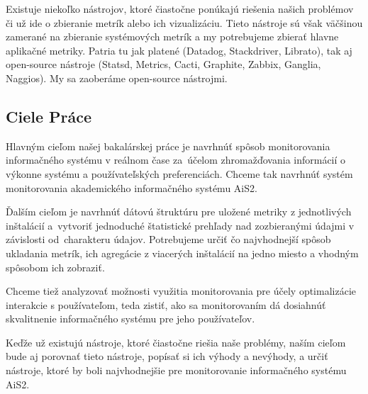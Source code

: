 \documentclass[a4paper, usesections, upjsfrontpage, thesismargins, thesislinespacing]{rnthesis}
\begin{document}
Existuje niekoľko nástrojov, ktoré čiastočne ponúkajú riešenia našich problémov či už ide o zbieranie metrík alebo ich vizualizáciu.
Tieto nástroje sú však väčšinou zamerané na zbieranie systémových metrík a my potrebujeme zbierať hlavne aplikačné metriky.
Patria tu jak platené (Datadog, Stackdriver, Librato), tak aj open-source nástroje (Statsd, Metrics, Cacti, Graphite, Zabbix, Ganglia, Naggios).
My sa zaoberáme open-source nástrojmi.


\subsection{Ciele Práce}


Hlavným cieľom našej bakalárskej práce je navrhnúť spôsob monitorovania informačného systému v reálnom čase za~úče\-lom zhromažďovania informácií o výkonne systému a používateľských pre\-ferenciách. 
Chceme tak navrhnúť systém monitorovania akademického informačného systému AiS2.

Ďalším cieľom je navrhnúť dátovú štruktúru pre uložené metriky z jednotlivých inštalácií a~vytvoriť jednoduché štatistické prehľady nad zozbieranými údajmi v závis\-losti od~charakteru údajov.
Potrebujeme určiť čo najvhodnejší spôsob ukladania metrík, ich agregácie z viacerých inštalácií na jedno miesto a vhodným spôsobom ich zobraziť.

Chceme tiež analyzovať možnosti využitia monitorovania pre účely optimalizácie interakcie s používateľom, teda zistiť, ako sa monitorovaním dá dosiahnúť skvalitnenie informačného systému pre jeho používateľov.

Keďže už existujú nástroje, ktoré čiastočne riešia naše problémy, naším cieľom bude aj porovnať tieto nástroje, popísať si ich výhody a nevýhody, a určiť nástroje, ktoré by boli najvhodnejšie pre monitorovanie informačného systému AiS2.
\end{document}
